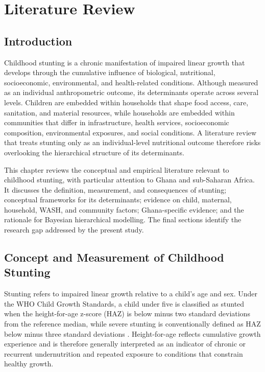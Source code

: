 \chapter{Literature Review}
\label{chap:literature_review}

\section{Introduction}

Childhood stunting is a chronic manifestation of impaired linear growth that develops through the cumulative influence of biological, nutritional, socioeconomic, environmental, and health-related conditions. Although measured as an individual anthropometric outcome, its determinants operate across several levels. Children are embedded within households that shape food access, care, sanitation, and material resources, while households are embedded within communities that differ in infrastructure, health services, socioeconomic composition, environmental exposures, and social conditions. A literature review that treats stunting only as an individual-level nutritional outcome therefore risks overlooking the hierarchical structure of its determinants.

This chapter reviews the conceptual and empirical literature relevant to childhood stunting, with particular attention to Ghana and sub-Saharan Africa. It discusses the definition, measurement, and consequences of stunting; conceptual frameworks for its determinants; evidence on child, maternal, household, WASH, and community factors; Ghana-specific evidence; and the rationale for Bayesian hierarchical modelling. The final sections identify the research gap addressed by the present study.

\section{Concept and Measurement of Childhood Stunting}

Stunting refers to impaired linear growth relative to a child's age and sex. Under the WHO Child Growth Standards, a child under five is classified as stunted when the height-for-age z-score (HAZ) is below minus two standard deviations from the reference median, while severe stunting is conventionally defined as HAZ below minus three standard deviations \cite{WHOStunting2026}. Height-for-age reflects cumulative growth experience and is therefore generally interpreted as an indicator of chronic or recurrent undernutrition and repeated exposure to conditions that constrain healthy growth.

